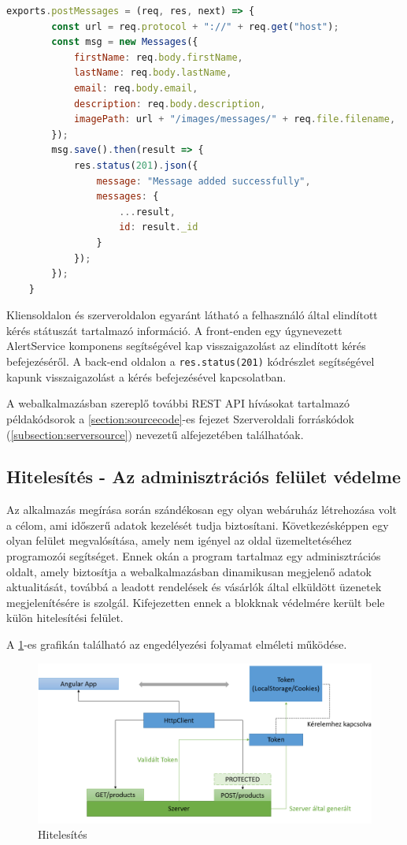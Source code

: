 \begin{lstlisting}[language=JavaScript]
	exports.postMessages = (req, res, next) => {
		const url = req.protocol + "://" + req.get("host");
		const msg = new Messages({
			firstName: req.body.firstName,
			lastName: req.body.lastName,
			email: req.body.email,
			description: req.body.description,
			imagePath: url + "/images/messages/" + req.file.filename,
		});
		msg.save().then(result => {
			res.status(201).json({
				message: "Message added successfully",
				messages: {
					...result,
					id: result._id
				}
			});
		});
	}
\end{lstlisting}

Kliensoldalon és szerveroldalon egyaránt látható a felhasználó által elindított kérés státuszát tartalmazó információ. A front-enden egy úgynevezett AlertService komponens segítségével kap visszaigazolást az elindított kérés befejezéséről. A back-end oldalon a \verb|res.status(201)| kódrészlet segítségével kapunk visszaigazolást a kérés befejezésével kapcsolatban.

\bigskip
A webalkalmazásban szereplő további REST API hívásokat tartalmazó példakódsorok a \ref{section:sourcecode}-es fejezet Szerveroldali forráskódok (\ref{subsection:serversource}) nevezetű alfejezetében találhatóak.

\subsection{Hitelesítés - Az adminisztrációs felület védelme}
Az alkalmazás megírása során szándékosan egy olyan webáruház létrehozása volt a célom, ami időszerű adatok kezelését tudja biztosítani. Következésképpen egy olyan felület megvalósítása, amely nem igényel az oldal üzemeltetéséhez programozói segítséget. Ennek okán a program tartalmaz egy adminisztrációs oldalt, amely biztosítja a webalkalmazásban dinamikusan megjelenő adatok aktualitását, továbbá a leadott rendelések és vásárlók által elküldött üzenetek megjelenítésére is szolgál. Kifejezetten ennek a blokknak védelmére került bele külön hitelesítési\cite{hitelesites} felület.

\bigskip
A \ref{fig.picture-10}-es grafikán található az engedélyezési folyamat elméleti működése.

\begin{figure}[H]
	\centering
	\includegraphics[width=1.0\textwidth]{images/hitelesites_bemutatasa.png}
	\caption{Hitelesítés}
	\label{fig.picture-10}
\end{figure}

